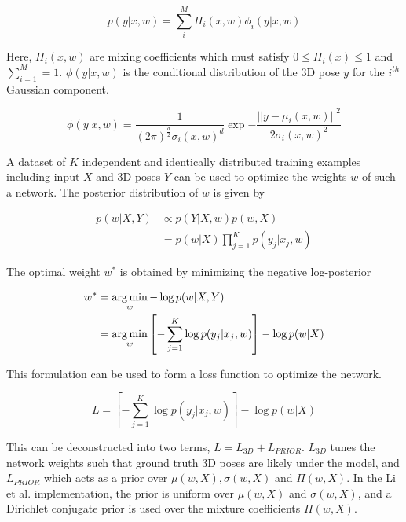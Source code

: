 \begin{equation}
  p(y | x, w) = \sum_{i}^{M} \Pi_{i}(x, w)\phi_{i}(y | x, w)
\end{equation}

Here, $\Pi_{i}(x, w)$ are mixing coefficients which must satisfy $0 \leq \Pi_{i}(x) \leq 1$ and $\sum_{i=1}^{M} = 1$. $\phi(y | x, w)$ is the conditional distribution of the 3D pose $y$ for the $i^{th}$ Gaussian component. 

\begin{equation}
  \phi(y | x, w) = 
    \frac{
      1
    }{
      (2\pi)^{\frac{d}{2}} \sigma_{i}(x, w)^{d}
    } 
    \exp{
    -\frac{
      || y - \mu_{i}(x, w) ||^{2}
    }{
      2\sigma_{i}(x, w)^{2}
    }
  }
\end{equation}

A dataset of $K$ independent and identically distributed training examples including input $X$ and 3D poses $Y$ can be used to optimize the weights $w$ of such a network. The posterior distribution of $w$ is given by

\begin{align}
  p(w | X, Y) 
  &\propto p(Y | X, w)p(w, X) \\
  &= p(w | X) \prod_{j=1}^{K} p(y_j | x_j, w)
\end{align}

The optimal weight $w^{*}$ is obtained by minimizing the negative log-posterior

\begin{align}
  w^{*} &= \operatorname*{arg\,min}_{w} -\log p(w | X, Y) \\
        &= \operatorname*{arg\,min}_{w} \left[-\sum_{j=1}^{K} \log p(y_j | x_j, w)\right] - \log p(w | X)
\end{align}

This formulation can be used to form a loss function to optimize the network. 

\begin{equation}
  L = \left[-\sum_{j=1}^{K} \log p(y_j | x_j, w)\right] - \log p(w | X)
\end{equation}

This can be deconstructed into two terms, $L = L_{3D} + L_{PRIOR}$. $L_{3D}$ tunes the network weights such that ground truth 3D poses are likely under the model, and $L_{PRIOR}$ which acts as a prior over $\mu(w, X), \sigma(w, X)$ and $\Pi(w, X)$. In the Li et al. implementation, the prior is uniform over $\mu(w, X)$ and $\sigma(w, X)$, and a Dirichlet conjugate prior is used over the mixture coefficients $\Pi(w, X)$. 


